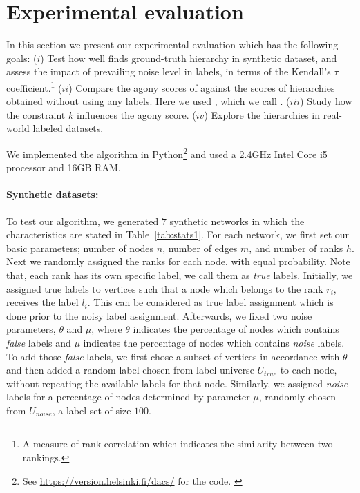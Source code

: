 \section{Experimental evaluation}\label{sec:exp}

In this section we present our experimental evaluation which has the following goals: 
($i$)  Test how well \algpartition finds ground-truth hierarchy in synthetic dataset,
  and assess the impact of prevailing  noise level in labels, in terms of the Kendall's $\tau$ coefficient.\!\footnote{A measure of rank correlation which indicates the similarity between two rankings.}
($ii$) Compare the agony scores of \algpartition against the scores of hierarchies obtained without using any labels.
	Here we used \cite{nikolaj2017tiers}, which we call \algexact.
($iii$) Study how the constraint $k$ influences the agony score.
($iv$) Explore the hierarchies in real-world labeled datasets.

We implemented the algorithm in Python\footnote{See \url{https://version.helsinki.fi/dacs/} for the code.
\label{foot:code}}
and used a 2.4GHz Intel Core i5 processor and 16GB RAM.


\paragraph{Synthetic datasets:}


To test our algorithm, we generated  $7$ synthetic networks in which the characteristics are stated in
Table~\ref{tab:stats1}.
For each network, we first set our basic parameters; number of nodes $n$, number of edges $m$, and number of ranks $h$. Next we  randomly assigned the 
ranks for each node, with equal probability.
Note that, each rank has its own specific label, we call them as \emph{true} labels. Initially,  we  assigned true labels to  vertices such that  a node which belongs to the rank $r_{i}$, receives  the label $l_{i}$. This can be considered as true label assignment which is done prior to the noisy label assignment. Afterwards, we fixed two  noise parameters, $\theta$ and $\mu$, where $\theta$ indicates the percentage of nodes which contains \emph{false}  labels and $\mu$ indicates the percentage of nodes which contains \emph{noise}  labels.  To add those \emph{false} labels, we first chose a subset of vertices in accordance with $\theta$ and then added a random label chosen from  label universe $U_{true}$ to each node, without repeating the available labels for that node. Similarly, we assigned  \emph{noise} labels for a percentage of nodes determined by parameter $\mu$, randomly chosen from  $U_{noise}$, a label set of size $100$. 

